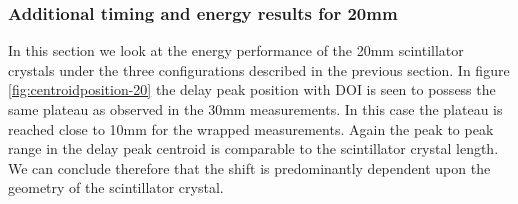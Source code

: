 \subsubsection{Additional timing and energy results for 20mm}
In this section we look at the energy performance of the 20mm scintillator crystals under the three configurations described in the previous section. In figure \ref{fig:centroidposition-20} the delay peak position with DOI is seen to possess the same plateau as observed in the 30mm measurements. In this case the plateau is reached close to 10mm for the wrapped measurements. Again the peak to peak range in the delay peak centroid is comparable to the scintillator crystal length. We can conclude therefore that the shift is predominantly dependent upon the geometry of the scintillator crystal. 